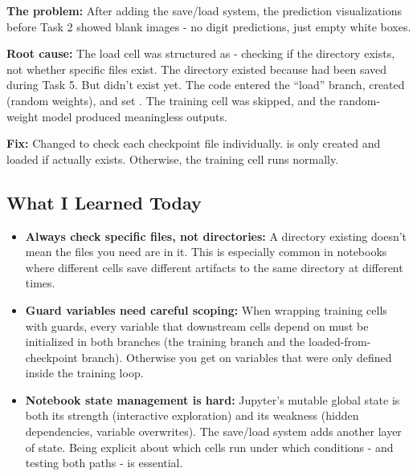 \documentclass[9pt,a4paper,twocolumn,twoside]{tau-class/tau}
\begin{document}
        \begin{tauenv}[frametitle={Challenge: Blank Images in Pre-Task-2 Visualizations}]
            \textbf{The problem:} After adding the save/load system, the prediction visualizations before Task 2 showed blank images - no digit predictions, just empty white boxes.

            \textbf{Root cause:} The load cell was structured as  - checking if the directory exists, not whether specific files exist. The  directory existed because  had been saved during Task 5. But  didn't exist yet. The code entered the ``load'' branch, created  (random weights), and set . The training cell was skipped, and the random-weight model produced meaningless outputs.

            \textbf{Fix:} Changed to check each checkpoint file individually.  is only created and loaded if  actually exists. Otherwise, the training cell runs normally.
        \end{tauenv}

    \subsection{What I Learned Today}

        \begin{itemize}
            \item \textbf{Always check specific files, not directories:} A directory existing doesn't mean the files you need are in it. This is especially common in notebooks where different cells save different artifacts to the same directory at different times.

            \item \textbf{Guard variables need careful scoping:} When wrapping training cells with  guards, every variable that downstream cells depend on must be initialized in both branches (the training branch and the loaded-from-checkpoint branch). Otherwise you get  on variables that were only defined inside the training loop.

            \item \textbf{Notebook state management is hard:} Jupyter's mutable global state is both its strength (interactive exploration) and its weakness (hidden dependencies, variable overwrites). The save/load system adds another layer of state. Being explicit about which cells run under which conditions - and testing both paths - is essential.
        \end{itemize}
\end{document}
